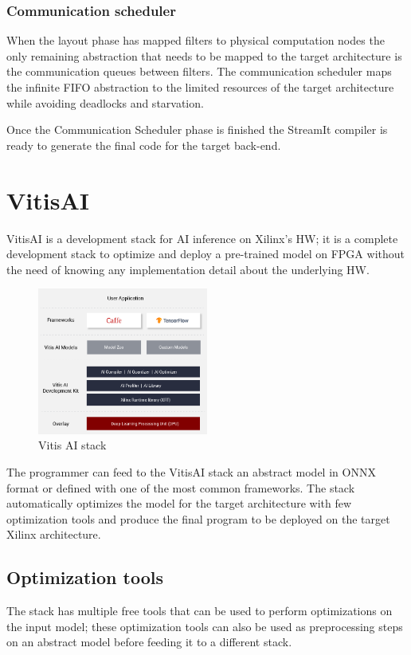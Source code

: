 \documentclass[../main.tex]{subfiles}
\begin{document}
\subsubsection{Communication scheduler}
When the layout phase has mapped filters to physical computation nodes the only remaining abstraction that needs to be mapped to the target architecture is the communication queues between filters. The communication scheduler maps the infinite FIFO abstraction to the limited resources of the target architecture while avoiding deadlocks and starvation.

Once the Communication Scheduler phase is finished the StreamIt compiler is ready to generate the final code for the target back-end.

\newpage
\section{VitisAI}
\label{vitis}

VitisAI \cite{VitisAI} is a development stack for AI inference on Xilinx's HW; it is a complete development stack to optimize and deploy a pre-trained model on FPGA without the need of knowing any implementation detail about the underlying HW.

\begin{figure}[h!]
  \includegraphics[width=0.5\textwidth]{images/Vitis-AI-Stack.png}
  \centering
  \caption{Vitis AI stack}
  \label{fig:VitisAIStack}
\end{figure}

The programmer can feed to the VitisAI stack an abstract model in ONNX format or defined with one of the most common frameworks. The stack automatically optimizes the model for the target architecture with few optimization tools and produce the final program to be deployed on the target Xilinx architecture.

\subsection{Optimization tools}
The stack has multiple free tools that can be used to perform optimizations on the input model; these optimization tools can also be used as preprocessing steps on an abstract model before feeding it to a different stack.
\end{document}
